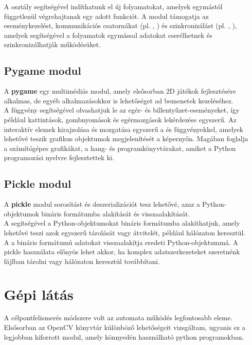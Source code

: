 A  osztály segítségével indíthatunk el új folyamatokat, amelyek egymástól függetlenül végrehajtanak egy adott funkciót. A modul támogatja az eseménykezelést, kommunikációs csatornákat (pl. , ) és szinkronizálást (pl. , ), amelyek segítségével a folyamatok egymással adatokat cserélhetnek és szinkronizálhatják működésüket.

\subsection*{Pygame modul \cite{pygame}}

A \textbf{pygame} egy multimédiás modul, amely elsősorban 2D játékok fejlesztésére alkalmas, de egyéb alkalmazásokkor is lehetőséget ad bemenetek kezeléséhez.\\

A  függvény segítségével olvashatjuk le az egér- és billentyűzet-eseményeket, így például kattintások, gombnyomások és egérmozgások lekérdezése egyszerű. Az interaktív elemek kirajzolása és mozgatása egyszerű a  és  függvényekkel, amelyek lehetővé teszik grafikus objektumok megjelenítését a képernyőn. Magában foglalja a számítógépes grafikákat, a hang- és programkönyvtárakat, amiket a Python programozási nyelvre fejlesztettek ki. 

\subsection*{Pickle modul \cite{pickle}}
A \textbf{pickle} modul sorosítást és deszerializációt tesz lehetővé, azaz a Python-objektumok bináris formátumba alakítását és visszaalakítását.\\

A  segítségével a Python-objektumokat bináris formátumba alakíthatjuk, amely lehetővé teszi azok egyszerű tárolását vagy átvitelét, például hálózaton keresztül. A  a bináris formátumú adatokat visszaalakítja eredeti Python-objektummá. A pickle használata előnyös lehet akkor, ha komplex adatszerkezeteket szeretnénk fájlban tárolni vagy hálózaton keresztül továbbítani.


\section{Gépi látás}
A célpontfelismerés módszere volt az automata működés legfontosabb eleme. Elsősorban az OpenCV könyvtár különböző lehetőségeit vizsgáltam, ugyanis ez a legjobban kiforrott modul, amely könnyedén használható python programokban.

